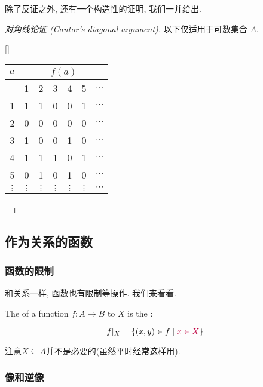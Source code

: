 除了反证之外, 还有一个构造性的证明, 我们一并给出. 

\begin{proof}[对角线论证 (Cantor's diagonal argument)]
以下仅适用于可数集合 $A$. 
  \begin{center}[]
    \begin{tabular}{|c||c|c|c|c|c|c|}
      \hline
      $a$      & \multicolumn{6}{c|}{$f(a)$} \\ \hline
            & 1      & 2      & 3      & 4      & 5      & $\cdots$ \\ \hline \hline
      1      & 1      & 1      & 0      & 0      & 1      & $\cdots$ \\ \hline
      2      & 0      & 0  & 0      & 0      & 0      & $\cdots$ \\ \hline
      3      & 1      & 0      & 0      & 1      & 0      & $\cdots$ \\ \hline
      4      & 1      & 1      & 1      & 0      & 1      & $\cdots$ \\ \hline
      5      & 0      & 1      & 0      & 1      & 0      & $\cdots$ \\ \hline
      $\vdots$ & $\vdots$ & $\vdots$ & $\vdots$ & $\vdots$ & $\vdots$ & $\cdots$ \\ \hline
    \end{tabular}
  \end{center}
\end{proof}

\subsection{作为关系的函数}

\subsubsection{函数的限制}
和关系一样, 函数也有限制等操作. 我们来看看. 

\begin{definition}[Restriction]
  The  of a function $f: A \to B$ to $X$
  is the :

  \[
    f|_{X} = \{(x, y) \in f \mid \textcolor{purple}{x \in X}\}
  \]
\end{definition}

注意$X \subseteq A$并不是必要的(虽然平时经常这样用). 

\subsubsection{像和逆像}

